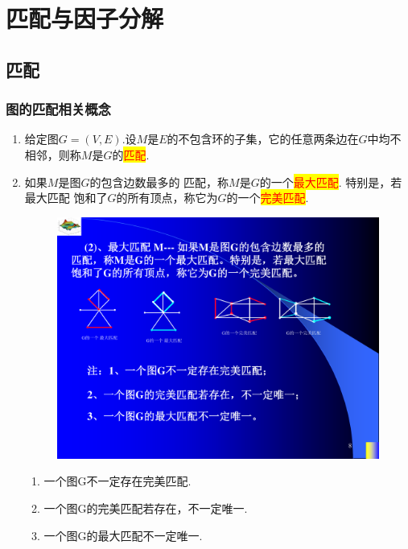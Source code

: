\section{匹配与因子分解}

\subsection{匹配}
\subsubsection{图的匹配相关概念}
\begin{enumerate}
	\item 给定图$G=(V,E)$.设$M$是$E$的不包含环的子集，它的任意两条边在$G$中均不相邻，则称$M$是$G$的\colorbox{yellow}{\textcolor{red}{匹配}}.
	\item 如果$M$是图$G$的包含边数最多的
	匹配，称$M$是$G$的一个\colorbox{yellow}{\textcolor{red}{最大匹配}}. 特别是，若最大匹配
	饱和了$G$的所有顶点，称它为$G$的一个\colorbox{yellow}{\textcolor{red}{完美匹配}}.
	\begin{figure}[H]
		\small
		\centering 
		\includegraphics[scale=0.65]{image/CH5_pipei.pdf}  
		\label{fikgkjjj1KKik}  
	\end{figure}
	\begin{note}
		\begin{enumerate}
			\item 一个图G不一定存在完美匹配.
			\item 一个图G的完美匹配若存在，不一定唯一.
			\item 一个图G的最大匹配不一定唯一.

\end{enumerate}
\end{note}
\end{enumerate}
